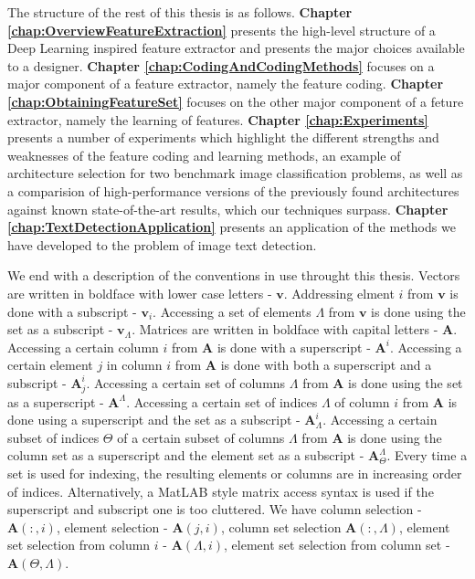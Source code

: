 \documentclass[12pt,a4paper,oneside,english]{UPBThesis}
\begin{document}
The structure of the rest of this thesis is as follows. \textbf{Chapter \ref{chap:OverviewFeatureExtraction}} presents the high-level structure of a Deep Learning inspired feature extractor and presents the major choices available to a designer. \textbf{Chapter \ref{chap:CodingAndCodingMethods}} focuses on a major component of a feature extractor, namely the feature coding. \textbf{Chapter \ref{chap:ObtainingFeatureSet}} focuses on the other major component of a feture extractor, namely the learning of features. \textbf{Chapter \ref{chap:Experiments}} presents a number of experiments which highlight the different strengths and weaknesses of the feature coding and learning methods, an example of architecture selection for two benchmark image classification problems, as well as a comparision of high-performance versions of the previously found architectures against known state-of-the-art results, which our techniques surpass. \textbf{Chapter \ref{chap:TextDetectionApplication}} presents an application of the methods we have developed to the problem of image text detection.

We end with a description of the conventions in use throught this thesis. Vectors are written in boldface with lower case letters - $\textbf{v}$. Addressing elment $i$ from $\textbf{v}$ is done with a subscript - $\textbf{v}_i$. Accessing a set of elements $\Lambda$ from $\textbf{v}$ is done using the set as a subscript - $\textbf{v}_\Lambda$. Matrices are written in boldface with capital letters - $\textbf{A}$. Accessing a certain column $i$ from $\textbf{A}$ is done with a superscript - $\textbf{A}^i$. Accessing a certain element $j$ in column $i$ from $\textbf{A}$ is done with both a superscript and a subscript - $\textbf{A}^i_j$. Accessing a certain set of columns $\Lambda$ from $\textbf{A}$ is done using the set as a superscript - $\textbf{A}^\Lambda$. Accessing a certain set of indices $\Lambda$ of column $i$ from $\textbf{A}$ is done using a superscript and the set as a subscript - $\textbf{A}^i_\Lambda$. Accessing a certain subset of indices $\Theta$ of a certain subset of columns $\Lambda$ from $\textbf{A}$ is done using the column set as a superscript and the element set as a subscript - $\textbf{A}^\Lambda_\Theta$. Every time a set is used for indexing, the resulting elements or columns are in increasing order of indices. Alternatively, a MatLAB style matrix access syntax is used if the superscript and subscript one is too cluttered. We have column selection - $\textbf{A}(:,i)$, element selection - $\textbf{A}(j,i)$, column set selection $\textbf{A}(:,\Lambda)$, element set selection from column $i$ - $\textbf{A}(\Lambda,i)$, element set selection from column set - $\textbf{A}(\Theta,\Lambda)$.
\end{document}
